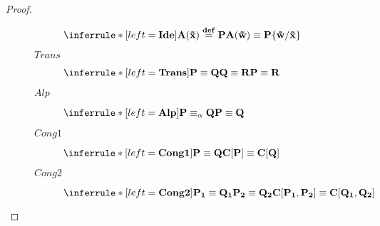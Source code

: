 \begin{proposition}
\begin{proof}
\begin{description}
\begin{description}
		$\inferrule* [left=\bf{Ide}]{A(\tilde{x})\stackrel{def}{=}P}{A(\tilde{w})\equiv P\{\tilde{w}/\tilde{x}\}}$
	      \item[$Trans$]
		$\inferrule* [left=\bf{Trans}]{P \equiv Q \\ Q \equiv R}{P \equiv R}$
	      \item[$Alp$]
		$\inferrule* [left=\bf{Alp}] {
		  P \equiv_{\alpha} Q
		}{
		  P\equiv Q
		}$
	      \item[$Cong1$]
		$\inferrule* [left=\bf{Cong1}]{P \equiv Q}{C[P] \equiv C[Q]}$
	      \item[$Cong2$]
		$\inferrule* [left=\bf{Cong2}]{P_{1} \equiv Q_{1} \\ P_{2} \equiv Q_{2}}{C[P_{1}, P_{2}] \equiv C[Q_{1}, Q_{2}]}$
	    \end{description}
    \end{description}
  \end{proof}
\end{proposition}

